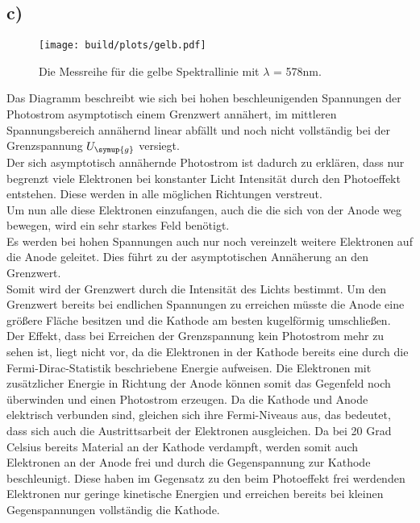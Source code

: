     \subsection{c)}

    \begin{figure}[H]
        \centering
        \texttt{[image: build/plots/gelb.pdf]}
        \caption{Die Messreihe für die gelbe Spektrallinie mit $\lambda$ = 578nm.}
        \label{img:gelb}
    \end{figure}

    \noindent
    Das Diagramm beschreibt wie sich bei hohen beschleunigenden Spannungen der Photostrom asymptotisch einem Grenzwert annähert, im mittleren 
    Spannungsbereich annähernd linear abfällt und noch nicht vollständig bei der Grenzspannung $U_{\symup{g}}$ versiegt.\\
    Der sich asymptotisch annähernde Photostrom ist dadurch zu erklären, dass nur begrenzt viele Elektronen bei konstanter Licht Intensität 
    durch den Photoeffekt entstehen. Diese werden in alle möglichen Richtungen verstreut.\\
    Um nun alle diese Elektronen einzufangen, auch die die sich  
    von der Anode weg bewegen, wird ein sehr starkes Feld benötigt.\\
    Es werden bei hohen Spannungen auch nur noch vereinzelt
    weitere Elektronen auf die Anode geleitet. Dies führt zu der asymptotischen Annäherung an den Grenzwert.\\
    Somit wird der Grenzwert durch die 
    Intensität des Lichts bestimmt. Um den Grenzwert bereits bei endlichen Spannungen zu erreichen müsste die Anode eine größere Fläche besitzen
    und die Kathode am besten kugelförmig umschließen.\\
    Der Effekt, dass bei Erreichen der Grenzspannung kein Photostrom mehr zu sehen ist, liegt nicht vor, da die Elektronen in der Kathode 
    bereits eine durch die Fermi-Dirac-Statistik beschriebene Energie aufweisen. Die Elektronen mit zusätzlicher Energie in Richtung der Anode 
    können somit das Gegenfeld noch überwinden und einen Photostrom erzeugen.
    Da die Kathode und Anode elektrisch verbunden sind, gleichen sich ihre Fermi-Niveaus aus, das bedeutet, dass sich auch die Austrittsarbeit 
    der Elektronen ausgleichen. Da bei 20 Grad Celsius bereits Material an der Kathode verdampft, werden somit auch Elektronen an der Anode frei 
    und durch die Gegenspannung zur Kathode beschleunigt.
    Diese haben im Gegensatz zu den beim Photoeffekt frei werdenden Elektronen nur geringe kinetische Energien und erreichen bereits bei kleinen 
    Gegenspannungen vollständig die Kathode.
    

